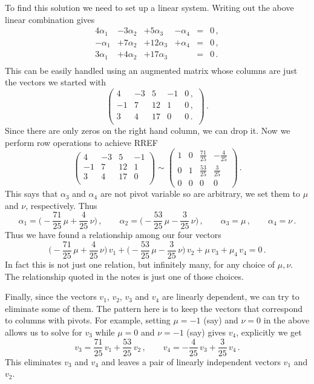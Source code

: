 {To find this solution we need to set up a linear system. Writing out the above linear combination gives 
$$
\begin{array}{cccccc}
4\alpha_1&-3\alpha_2&+5\alpha_3&-\alpha_4 &=&0\, ,\\
-\alpha_1&+7\alpha_2&+12\alpha_3&+\alpha_4 &=&0\, ,\\
3\alpha_1&+4\alpha_2&+17\alpha_3& &=&0\, .\\
\end{array}
$$
This can be easily handled using an augmented matrix whose columns are just the vectors we started with
$$
\left(
\begin{array}{cccc|c}
4&-3&5&-1 &0\, ,\\
-1&7&12&1 &0\, ,\\
3&4&17& 0&0\, .\\
\end{array}\right)\, .
$$
Since there are only zeros on the right hand column, we can drop it. Now we perform row operations to achieve RREF
$$
\begin{pmatrix}
4&-3&5&-1 \\
-1&7&12&1 \\
3&4&17& 0\\
\end{pmatrix}\sim
\begin{pmatrix}
1 & 0 & \frac{71}{25}& -\frac 4{25}\\[1mm]
0&1&\frac{53}{25}&\frac 3{25}\\[1mm]
0&0&0&0
\end{pmatrix}\, .
$$
This says that $\alpha_3$ and $\alpha_4$ are not pivot variable so are arbitrary, we set them to $\mu$ and $\nu$, respectively.
Thus
$$
\alpha_1=\Big(-\frac{71}{25}\, \mu+\frac4{25}\, \nu\Big)\, ,\qquad \alpha_2=\Big(-\frac{53}{25}\, \mu-\frac{3}{25}\, \nu\Big)\, ,\qquad
\alpha_3=\mu\, ,\qquad \alpha_4= \nu\, .
$$
Thus we have found a relationship among our four vectors
$$
\Big(-\frac{71}{25}\, \mu+\frac4{25}\, \nu\Big)\, v_1+\Big(-\frac{53}{25}\, \mu-\frac{3}{25}\, \nu\Big)\, v_2
+\mu\,  v_3+ \mu_4\,  v_4=0\, .
$$
In fact this is not just one relation, but infinitely many, for any choice of $\mu,\nu$. 
The relationship quoted in the notes is just one of those choices.

Finally, since the vectors $v_1$, $v_2$, $v_3$ and $v_4$ are linearly dependent, we can try to eliminate some of them.
The pattern here is to keep the vectors that correspond to columns with pivots. For example, setting $\mu=-1$ (say) and $\nu=0$ 
in the above allows us to solve for $v_3$ while $\mu=0$ and $\nu=-1$ (say) gives $v_4$, explicitly we get
$$
v_3=\frac{71}{25}\,  v_1 + \frac{53}{25}\, v_2\, ,\qquad 
v_4=-\frac{4}{25}\, v_3 + \frac 3{25} \, v_4\, .
$$
This eliminates $v_3$ and $v_4$ and leaves a pair of linearly independent vectors $v_1$ and $v_2$.




} %

